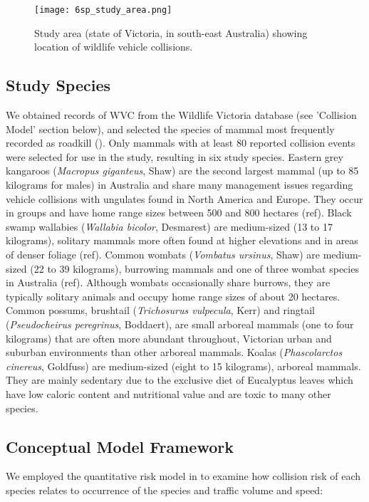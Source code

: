 \begin{figure*}[htp]
  \centering
  \texttt{[image: 6sp\_study\_area.png]}
  \caption[]{Study area (state of Victoria, in south-east Australia) showing location of wildlife vehicle collisions.}
  \label{6sp_study_area}
\end{figure*}

\subsection{Study Species}

We obtained records of WVC from the Wildlife Victoria database (see 'Collision Model' section below), and selected the species of mammal most frequently recorded as roadkill (). Only mammals with at least 80 reported collision events were selected for use in the study, resulting in six study species.  Eastern grey kangaroos (\textit{Macropus giganteus}, Shaw) are the second largest mammal (up to 85 kilograms for males) in Australia and share many management issues regarding vehicle collisions \citep{crof04,coul10} with ungulates found in North America and Europe. They occur in groups and have home range sizes between 500 and 800 hectares (ref).  Black swamp wallabies (\textit{Wallabia bicolor}, Desmarest) are medium-sized (13 to 17 kilograms), solitary mammals more often found at higher elevations and in areas of denser foliage (ref). Common wombats (\textit{Vombatus ursinus}, Shaw) are medium-sized (22 to 39 kilograms), burrowing mammals and one of three wombat species in Australia (ref). Although wombats occasionally share burrows, they are typically solitary animals and occupy home range sizes of about 20 hectares. Common possums, brushtail (\textit{Trichosurus vulpecula}, Kerr) and ringtail (\textit{Pseudocheirus peregrinus}, Boddaert), are small arboreal mammals (one to four kilograms) that are often more abundant throughout, Victorian urban and suburban environments than other arboreal mammals.  Koalas (\textit{Phascolarctos cinereus}, Goldfuss) are medium-sized (eight to 15 kilograms), arboreal mammals.  They are mainly sedentary due to the exclusive diet of Eucalyptus leaves which have low caloric content and nutritional value and are toxic to many other species.

\subsection{Conceptual Model Framework}

We employed the quantitative risk model in  to examine how collision risk of each species relates to occurrence of the species and traffic volume and speed: 

